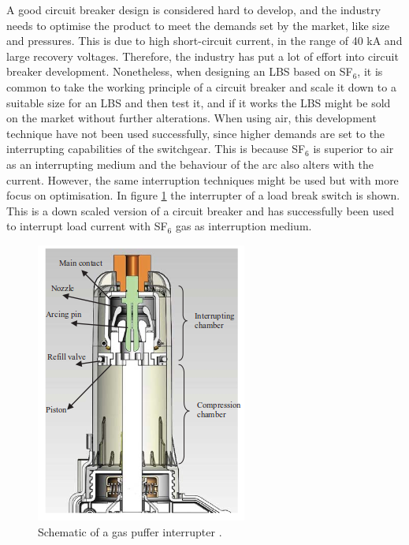 \documentclass[10pt,a4paper,twoside]{article}
\begin{document}
A good circuit breaker design is considered hard to develop, and the industry needs to optimise the product to meet the demands set by the market, like size and pressures. This is due to high short-circuit current, in the range of 40 kA and large recovery voltages. Therefore, the industry has put a lot of effort into circuit breaker development. Nonetheless, when designing an LBS based on SF$_6$, it is common to take the working principle of a circuit breaker and scale it down to a suitable size for an LBS and then test it, and if it works the LBS might be sold on the market without further alterations. When using air, this development technique have not been used successfully, since higher demands are set to the interrupting capabilities of the switchgear. This is because SF$_6$ is superior to air as an interrupting medium and the behaviour of the arc also alters with the current. However, the same interruption techniques might be used but with more focus on optimisation. In figure \ref{fig:selfBlastandPuffer} the interrupter of a load break switch is shown. This is a down scaled version of a circuit breaker and has successfully been used to interrupt load current with SF$_6$ gas as interruption medium. 

\begin{figure} [H]
\centering
\includegraphics[scale=0.5]{Bilder/Theory/LBSselfblastandPuffer.png}
\caption{Schematic of a gas puffer interrupter \cite{bib:CBAC}.} \label{fig:selfBlastandPuffer}
\end{figure}
\end{document}
